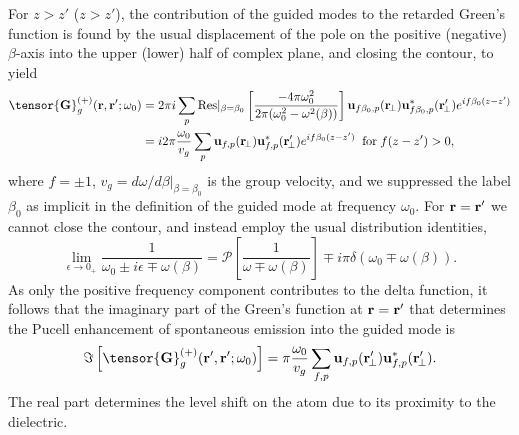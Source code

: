 \documentclass[preprint,aps,pra,onecolumn]{revtex4-1} %
\begin{document}
For $z>z'$ ($z>z'$), the contribution of the guided modes to the retarded Green's function is found by the usual displacement of the pole on the positive (negative) $\beta$-axis into the upper (lower) half of complex plane, and closing the contour, to yield
\begin{align}
\tensor{\mathbf{G}}^{(+)}_g(\br,\br'; \omega_0) &= 2\pi i \sum_{p}  {\rm Res}\vert_{\beta =\beta_0} \left[\frac{-4\pi \omega_0^2}{2\pi (\omega_0^2-\omega^2(\beta))}\right]  \mathbf{u}_{f\beta_0, p} (\br\!_\perp)\mathbf{u}^*_{f\beta_0, p} (\br_{\!\perp}^\prime)e^{if \beta_0 (z-z')} \nonumber \\
&  = i 2\pi \frac{\omega_0}{v_g } \sum_{p} \mathbf{u}_{f, p} (\br\!_\perp)\mathbf{u}^*_{f , p} (\br_{\!\perp}^\prime) e^{if \beta_0(z-z')}\;\; {\rm for }\;  f(z-z')>0,
\label{eq:Gganaly}
\end{align}
where $f=\pm 1$, $v_g= d\omega/d\beta \vert_{\beta=\beta_0}$ is the group velocity, and we suppressed the label $\beta_0$ as implicit in the definition of the guided mode at frequency $\omega_0$. For $\mathbf{r}=\mathbf{r}'$ we cannot close the contour, and instead employ the usual distribution identities,
\begin{equation}
\lim_{\epsilon \rightarrow 0_+} \frac{1}{\omega_0\pm i \epsilon \mp \omega(\beta)}=\mathcal{P}\left[\frac{1}{\omega \mp \omega(\beta)} \right] \mp i \pi \delta (\omega_0 \mp \omega(\beta)).
\end{equation}
As only the positive frequency component contributes to the delta function, it follows that the imaginary part of the Green's function at $\mathbf{r} = \mathbf{r}'$ that determines the Pucell enhancement of spontaneous emission into the guided mode is
\begin{equation}
\Im\left[\tensor{\mathbf{G}}^{(+)}_g(\br',\br'; \omega_0) \right] = \pi \frac{\omega_0}{v_g } \sum_{f, p} \mathbf{u}_{f, p} (\br_{\!\perp}^\prime)\mathbf{u}^*_{f , p} (\br_{\!\perp}^\prime).
\end{equation}
The real part determines the level shift on the atom due to its proximity to the dielectric.
\end{document}
